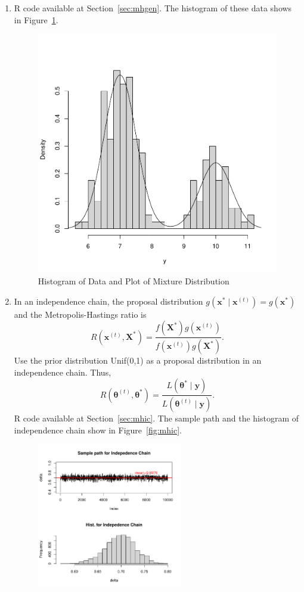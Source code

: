 \documentclass[11pt]{article}
\begin{document}
\begin{enumerate}
    \item R code available at Section~\ref{sec:mhgen}. The histogram of these data shows in Figure~\ref{fig:hist}.
        \begin{figure}[!htb]
            \begin{center}
                \includegraphics[width=0.6\linewidth]{img/mhgen-1.pdf}
            \end{center}
            \caption{Histogram of Data and Plot of Mixture Distribution}
            \label{fig:hist}
        \end{figure}
    \item In an independence chain, the proposal distribution $g\left(\mathbf{x}^{*} \mid \mathbf{x}^{(t)}\right)=g\left(\mathbf{x}^{*}\right)$ and the Metropolis-Hastings ratio is$$R\left(\mathbf{x}^{(t)}, \mathbf{X}^{*}\right)=\frac{f\left(\mathbf{X}^{*}\right) g\left(\mathbf{x}^{(t)}\right)}{f\left(\mathbf{x}^{(t)}\right) g\left(\mathbf{X}^{*}\right)}.$$Use the prior distribution Unif(0,1) as a proposal distribution in an independence chain. Thus, $$R\left(\boldsymbol{\theta}^{(t)}, \boldsymbol{\theta}^{*}\right)=\frac{L\left(\boldsymbol{\theta}^{*} \mid \mathbf{y}\right)}{L\left(\boldsymbol{\theta}^{(t)} \mid \mathbf{y}\right)}.$$ R code available at Section~\ref{sec:mhic}. The sample path and the histogram of independence chain show in Figure~\ref{fig:mhic}.
    \begin{figure}[!hbt]
        \begin{center}
            \includegraphics[width=0.6\textwidth]{img/mhic-1.pdf}

\end{center}
\end{figure}
\end{enumerate}
\end{document}
